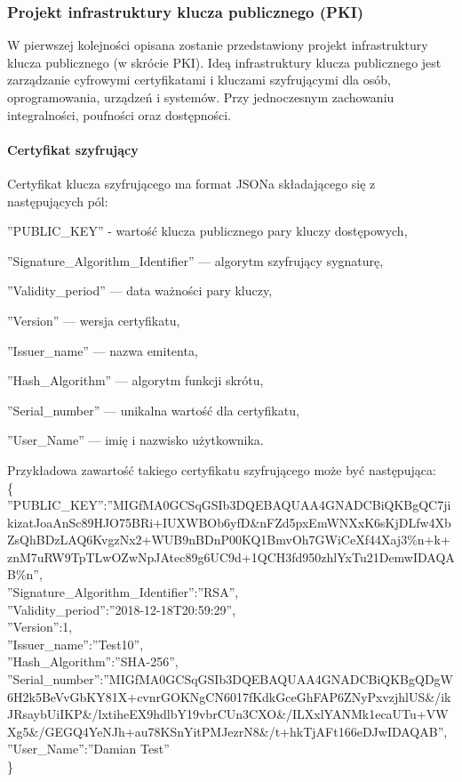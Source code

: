 \documentclass[twoside,10pt]{article}
\begin{document}
\subsubsection{Projekt infrastruktury klucza publicznego (PKI)}\label{sec:Projekt PKI}
W pierwszej kolejności opisana zostanie przedstawiony projekt infrastruktury klucza publicznego (w skrócie PKI). Ideą infrastruktury klucza publicznego jest zarządzanie cyfrowymi certyfikatami i kluczami szyfrującymi dla osób, oprogramowania, urządzeń i systemów. Przy jednoczesnym zachowaniu integralności, poufności oraz dostępności.
\paragraph*{Certyfikat szyfrujący}
Certyfikat klucza szyfrującego ma format JSONa składającego się z następujących pól:
\begin{itemize*}
\item ''PUBLIC\_KEY” - wartość klucza publicznego pary kluczy dostępowych,
\item ''Signature\_Algorithm\_Identifier'' --- algorytm szyfrujący sygnaturę,
\item ''Validity\_period'' --- data ważności pary kluczy,
\item ''Version'' --- wersja certyfikatu,
\item ''Issuer\_name'' --- nazwa emitenta,
\item ''Hash\_Algorithm'' --- algorytm funkcji skrótu,
\item ''Serial\_number'' --- unikalna wartość dla certyfikatu,
\item ''User\_Name'' --- imię i nazwisko użytkownika.
\end{itemize*}
\newpage
Przykładowa zawartość takiego certyfikatu szyfrującego może być następująca:\\
{\footnotesize  \{\\
	''PUBLIC\_KEY'':''MIGfMA0GCSqGSIb3DQEBAQUAA4GNADCBiQKBgQC7jik\linebreak izatJoaAnSc89HJO75BRi+IUXWBOb6yfD\&nFZd5pxEmWNXxK6sKjDLfw4XbZ\linebreak sQhBDzLAQ6KvgzNx2+WUB9nBDnP00KQ1BmvOh7GWiCeXf44Xaj3\%n+k+znM7\linebreak uRW9TpTLwOZwNpJAtec89g6UC9d+1QCH3fd950zhlYxTu21DemwIDAQAB\%n'',\\
	''Signature\_Algorithm\_Identifier'':''RSA'',\\
	''Validity\_period'':''2018-12-18T20:59:29'',\\
	''Version'':1,\\
	''Issuer\_name'':''Test10'',\\
	''Hash\_Algorithm'':''SHA-256'',\\
	''Serial\_number'':''MIGfMA0GCSqGSIb3DQEBAQUAA4GNADCBiQKBgQD\linebreak gW6H2k5BeVvGbKY81X+cvnrGOKNgCN6017fKdkGceGhFAP6ZNyPxvzjhlUS\&\linebreak /ikJRsaybUiIKP\&/lxtiheEX9hdlbY19vbrCUn3CXO\&/ILXxlYANMk1eca\linebreak UTu+VWXg5\&/GEGQ4YeNJh+au78KSnYitPMJezrN8\&/t+hkTjAFt166eDJw\linebreak IDAQAB'',\\
	''User\_Name'':''Damian Test''  \\
	\}}
\end{document}
